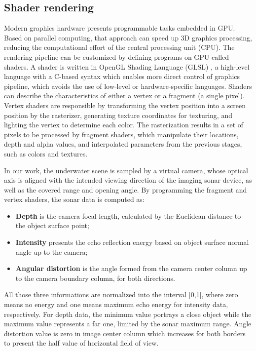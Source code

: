 \documentclass[final,5p,times]{elsarticle}
\begin{document}

\subsection{Shader rendering}
\label{dev:shader}

Modern graphics hardware presents programmable tasks embedded in GPU. Based on parallel computing, that approach can speed up 3D graphics processing, reducing the computational effort of the central processing unit (CPU). The rendering pipeline can be customized by defining programs on GPU called shaders. A shader is written in OpenGL Shading Language (GLSL) \cite{rost2009}, a high-level language with a C-based syntax which enables more direct control of graphics pipeline, which avoids the use of low-level or hardware-specific languages. Shaders can describe the characteristics of either a vertex or a fragment (a single pixel). Vertex shaders are responsible by transforming the vertex position into a screen position by the rasterizer, generating texture coordinates for texturing, and lighting the vertex to determine each color. The rasterization results in a set of pixels to be processed by fragment shaders, which manipulate their locations, depth and alpha values, and interpolated parameters from the previous stages, such as colors and textures.

In our work, the underwater scene is sampled by a virtual camera, whose optical axis is aligned with the intended viewing direction of the imaging sonar device, as well as the covered range and opening angle. By programming the fragment and vertex shaders, the sonar data is computed as:

\begin{itemize}[(a)]
    \item \textbf{Depth} is the camera focal length, calculated by the Euclidean distance to the object surface point;
    \item \textbf{Intensity} presents the echo reflection energy based on object surface normal angle up to the camera;
    \item \textbf{Angular distortion} is the angle formed from the camera center column up to the camera boundary column, for both directions.
\end{itemize}

All those three informations are normalized into the interval [0,1], where zero means no energy and one means maximum echo energy for intensity data, respectively. For depth data, the minimum value portrays a close object while the maximum value represents a far one, limited by the sonar maximum range. Angle distortion value is zero in image center column which increases for both borders to present the half value of horizontal field of view.
\end{document}
